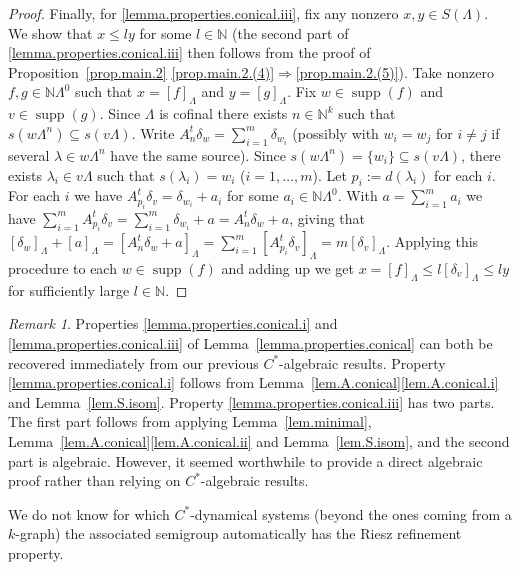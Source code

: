 \documentclass[a4paper, 12pt]{amsart}
\numberwithin{equation}{section}
\newcounter{theorem}
\theoremstyle{remark}
\newtheorem{remark}[theorem]{Remark}
\theoremstyle{definition}
\begin{document}
\begin{proof}
Finally, for \eqref{lemma.properties.conical.iii}, fix any nonzero $x,y\in S(\Lambda)$. We show that $x\leq ly$ for some
$l\in {\mathbb{N}}$ (the second part of \eqref{lemma.properties.conical.iii} then follows from the proof of
Proposition~\ref{prop.main.2} \eqref{prop.main.2.(4)}$\Rightarrow$\eqref{prop.main.2.(5)}). Take nonzero $f,g\in {\mathbb{N}}\Lambda^0$
such that $x={{[{f}]_\Lambda}}$ and $y={{[{g}]_\Lambda}}$. Fix $w\in {\operatorname{supp}}(f)$ and $v\in {\operatorname{supp}}(g)$.
Since $\Lambda$ is cofinal there exists $n\in {\mathbb{N}}^k$ such that $s(w\Lambda^n)\subseteq s(v\Lambda)$. Write $A^t_n\delta_w
= \sum_{i=1}^m \delta_{w_i}$ (possibly with $w_i=w_j$ for $i\neq j$ if several
$\lambda\in w\Lambda^n$ have the same source). Since $s(w\Lambda^n)=\{w_i\}\subseteq
s(v\Lambda)$, there exists $\lambda_i\in v\Lambda$ such that
$s(\lambda_i)=w_i$ ($i=1,\dots,m$). Let $p_i:=d(\lambda_i)$ for each $i$. For each $i$ we have
$A^t_{p_i}\delta_v=\delta_{w_i} +a_i$ for some $a_i\in {\mathbb{N}}\Lambda^0$. With
$a=\sum_{i=1}^m a_i$ we have $\sum_{i=1}^mA^t_{p_i}\delta_v=\sum_{i=1}^m\delta_{w_i} + a
= A^t_n\delta_w + a$, giving that ${{[{\delta_w}]_\Lambda}}+{{[{a}]_\Lambda}}={{[{A^t_n\delta_w
+a}]_\Lambda}}=\sum_{i=1}^m {{[{A^t_{p_i}\delta_v}]_\Lambda}}=m{{[{\delta_v}]_\Lambda}}$. Applying this procedure to
each $w\in {\operatorname{supp}}(f)$ and adding up we get $x={{[{f}]_\Lambda}}\leq l{{[{\delta_v}]_\Lambda}}\leq ly$ for
sufficiently large $l\in {\mathbb{N}}$.
\end{proof}

 \begin{remark} Properties \eqref{lemma.properties.conical.i} and \eqref{lemma.properties.conical.iii} of Lemma~\ref{lemma.properties.conical} can both be recovered immediately from our previous $C^*$-algebraic results. Property \eqref{lemma.properties.conical.i} follows from Lemma~\ref{lem.A.conical}\eqref{lem.A.conical.i} and Lemma~\ref{lem.S.isom}. Property \eqref{lemma.properties.conical.iii} has two parts. The first part follows from applying Lemma~\ref{lem.minimal}, Lemma~\ref{lem.A.conical}\eqref{lem.A.conical.ii} and Lemma~\ref{lem.S.isom}, and the second part is algebraic. However, it seemed worthwhile to provide a direct algebraic proof rather than relying on $C^*$-algebraic results.

 We do not know for which $C^*$-dynamical systems (beyond the ones coming from a $k$-graph) the associated semigroup automatically has the Riesz refinement property.
 \end{remark}
\end{document}
